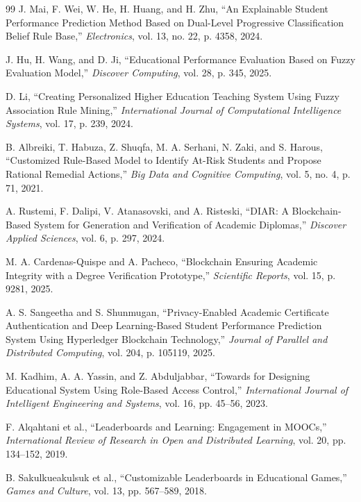 \documentclass[conference]{IEEEtran}
\begin{document}
\begin{thebibliography}{99}
J. Mai, F. Wei, W. He, H. Huang, and H. Zhu, ``An Explainable Student Performance Prediction Method Based on Dual-Level Progressive Classification Belief Rule Base,'' \textit{Electronics}, vol. 13, no. 22, p. 4358, 2024.

J. Hu, H. Wang, and D. Ji, ``Educational Performance Evaluation Based on Fuzzy Evaluation Model,'' \textit{Discover Computing}, vol. 28, p. 345, 2025.

D. Li, ``Creating Personalized Higher Education Teaching System Using Fuzzy Association Rule Mining,'' \textit{International Journal of Computational Intelligence Systems}, vol. 17, p. 239, 2024.

B. Albreiki, T. Habuza, Z. Shuqfa, M. A. Serhani, N. Zaki, and S. Harous, ``Customized Rule-Based Model to Identify At-Risk Students and Propose Rational Remedial Actions,'' \textit{Big Data and Cognitive Computing}, vol. 5, no. 4, p. 71, 2021.

A. Rustemi, F. Dalipi, V. Atanasovski, and A. Risteski, ``DIAR: A Blockchain-Based System for Generation and Verification of Academic Diplomas,'' \textit{Discover Applied Sciences}, vol. 6, p. 297, 2024.

M. A. Cardenas-Quispe and A. Pacheco, ``Blockchain Ensuring Academic Integrity with a Degree Verification Prototype,'' \textit{Scientific Reports}, vol. 15, p. 9281, 2025.

A. S. Sangeetha and S. Shunmugan, ``Privacy-Enabled Academic Certificate Authentication and Deep Learning-Based Student Performance Prediction System Using Hyperledger Blockchain Technology,'' \textit{Journal of Parallel and Distributed Computing}, vol. 204, p. 105119, 2025.

M. Kadhim, A. A. Yassin, and Z. Abduljabbar, ``Towards for Designing Educational System Using Role-Based Access Control,'' \textit{International Journal of Intelligent Engineering and Systems}, vol. 16, pp. 45--56, 2023.

F. Alqahtani et al., ``Leaderboards and Learning: Engagement in MOOCs,'' \textit{International Review of Research in Open and Distributed Learning}, vol. 20, pp. 134--152, 2019.

B. Sakulkueakulsuk et al., ``Customizable Leaderboards in Educational Games,'' \textit{Games and Culture}, vol. 13, pp. 567--589, 2018.

\end{thebibliography}
\end{document}
